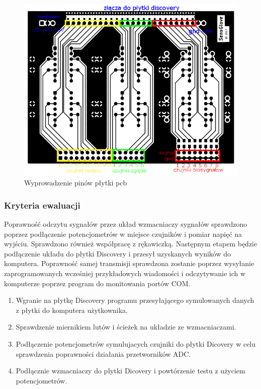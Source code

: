 \documentclass{article}
\begin{document}
\begin{figure}[h!]
    \centering
    \includegraphics[scale=0.6]{pinout.png}
    \caption{Wyprowadzenie pinów płytki pcb}
    \label{rys:pinout}
\end{figure}

\subsubsection{Kryteria ewaluacji}
Poprawność odczytu sygnałów przez układ wzmacniaczy sygnałów sprawdzono poprzez podłączenie potencjometrów w miejsce czujników i pomiar napięć na wyjściu. Sprawdzono również współpracę z rękawiczką. 
Następnym etapem będzie podłączenie układu do płytki Discovery i przesył uzyskanych wyników do komputera. 
Poprawność samej transmisji sprawdzona zostanie poprzez wysyłanie zaprogramowanych wcześniej przykładowych wiadomości i odczytywanie ich w komputerze poprzez program do monitowania portów COM.

\begin{enumerate}
	\item Wgranie na płytkę Discovery programu przesyłającego symulowanych danych z płytki do komputera użytkownika.
	\item Sprawdzenie miernikiem lutów i ścieżek na układzie ze wzmacniaczami.
	\item Podłączenie potencjometrów symulujacych czujniki do płytki Dicovery w celu sprawdzenia poprawności działania przetworników ADC.
	\item Podłącznie wzmacniaczy do płytki Dicovery i powtórzenie testu z użyciem potencjometrów.
\end{enumerate}
\end{document}
